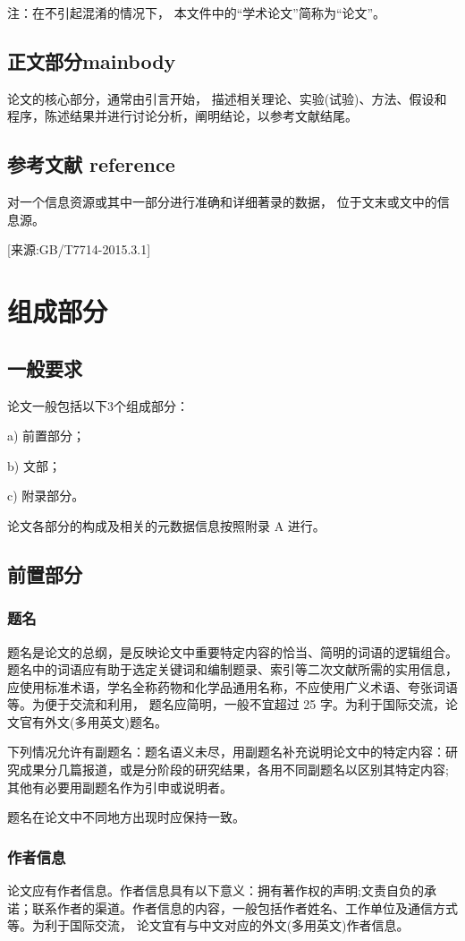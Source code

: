 注：在不引起混淆的情况下， 本文件中的“学术论文”简称为“论文”。

\section{正文部分mainbody}
论文的核心部分，通常由引言开始， 描述相关理论、实验(试验)、方法、假设和程序，陈述结果并进行讨论分析，阐明结论，以参考文献结尾。

\section{参考文献 reference}
对一个信息资源或其中一部分进行准确和详细著录的数据， 位于文末或文中的信息源。

[来源:GB/T7714-2015.3.1]


\chapter{组成部分}
\section{一般要求}
论文一般包括以下3个组成部分：

a) 前置部分；

b) 文部；

c) 附录部分。

论文各部分的构成及相关的元数据信息按照附录 A 进行。

\section{前置部分}
\subsection{题名}
题名是论文的总纲，是反映论文中重要特定内容的恰当、简明的词语的逻辑组合。题名中的词语应有助于选定关键词和编制题录、索引等二次文献所需的实用信息，应使用标准术语，学名全称药物和化学品通用名称，不应使用广义术语、夸张词语等。为便于交流和利用， 题名应简明，一般不宜超过 25 字。为利于国际交流，论文官有外文(多用英文)题名。

下列情况允许有副题名：题名语义未尽，用副题名补充说明论文中的特定内容：研究成果分几篇报道，或是分阶段的研究结果，各用不同副题名以区别其特定内容;其他有必要用副题名作为引申或说明者。

题名在论文中不同地方出现时应保持一致。

\subsection{作者信息}
论文应有作者信息。作者信息具有以下意义：拥有著作权的声明;文责自负的承诺；联系作者的渠道。作者信息的内容，一般包括作者姓名、工作单位及通信方式等。为利于国际交流， 论文宜有与中文对应的外文(多用英文)作者信息。

